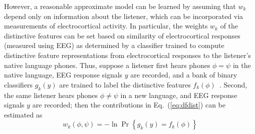 However, a reasonable approximate model can be learned by assuming
that $w_k$ depend only on information about the listener, which can be
incorporated via measurements of electrocortical activity. In
particular, the weights $w_k$ of the distinctive features can be set
based on similarity of electrocortical responses (measured using EEG)
as determined by a classifier trained to compute distinctive feature
representations from electrocortical responses to the listener's native
language phones.
Thus, suppose a listener first hears phones $\phi=\psi$ in the native
language, EEG response signals $y$ are recorded, and a bank of
binary classifiers $g_k(y)$ are trained to label the distinctive
features $f_k(\phi)$~\cite{Liberto15}.  Second, the same listener
hears phones $\phi\ne\psi$ in a new language, and EEG response
signals $y$ are recorded;
then the contributions in
Eq.~(\ref{eq:dfdist}) can be estimated as
\begin{equation}
  w_k(\phi,\psi) = -\ln\Pr\left\{g_k(y)= f_k(\phi)\right\}
  \label{eq:eegdist}
\end{equation}
